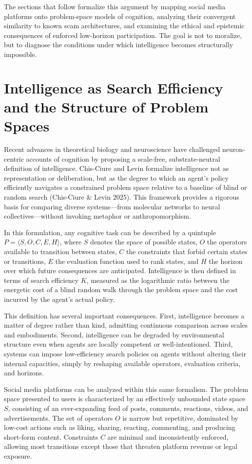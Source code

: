 \documentclass[12pt]{article}
\begin{document}
The sections that follow formalize this argument by mapping social media platforms onto problem-space models of cognition, analyzing their convergent similarity to known scam architectures, and examining the ethical and epistemic consequences of enforced low-horizon participation. The goal is not to moralize, but to diagnose the conditions under which intelligence becomes structurally impossible.

\section{Intelligence as Search Efficiency and the Structure of Problem Spaces}

Recent advances in theoretical biology and neuroscience have challenged neuron-centric accounts of cognition by proposing a scale-free, substrate-neutral definition of intelligence. Chis-Ciure and Levin formalize intelligence not as representation or deliberation, but as the degree to which an agent’s policy efficiently navigates a constrained problem space relative to a baseline of blind or random search (Chis-Ciure \& Levin 2025). This framework provides a rigorous basis for comparing diverse systems—from molecular networks to neural collectives—without invoking metaphor or anthropomorphism.

In this formulation, any cognitive task can be described by a quintuple \( P = \langle S, O, C, E, H \rangle \), where \( S \) denotes the space of possible states, \( O \) the operators available to transition between states, \( C \) the constraints that forbid certain states or transitions, \( E \) the evaluation function used to rank states, and \( H \) the horizon over which future consequences are anticipated. Intelligence is then defined in terms of search efficiency \( K \), measured as the logarithmic ratio between the energetic cost of a blind random walk through the problem space and the cost incurred by the agent’s actual policy.

This definition has several important consequences. First, intelligence becomes a matter of degree rather than kind, admitting continuous comparison across scales and embodiments. Second, intelligence can be degraded by environmental structure even when agents are locally competent or well-intentioned. Third, systems can impose low-efficiency search policies on agents without altering their internal capacities, simply by reshaping available operators, evaluation criteria, and horizons.

Social media platforms can be analyzed within this same formalism. The problem space presented to users is characterized by an effectively unbounded state space \( S \), consisting of an ever-expanding feed of posts, comments, reactions, videos, and advertisements. The set of operators \( O \) is narrow but repetitive, dominated by low-cost actions such as liking, sharing, reacting, commenting, and producing short-form content. Constraints \( C \) are minimal and inconsistently enforced, allowing most transitions except those that threaten platform revenue or legal exposure.
\end{document}
